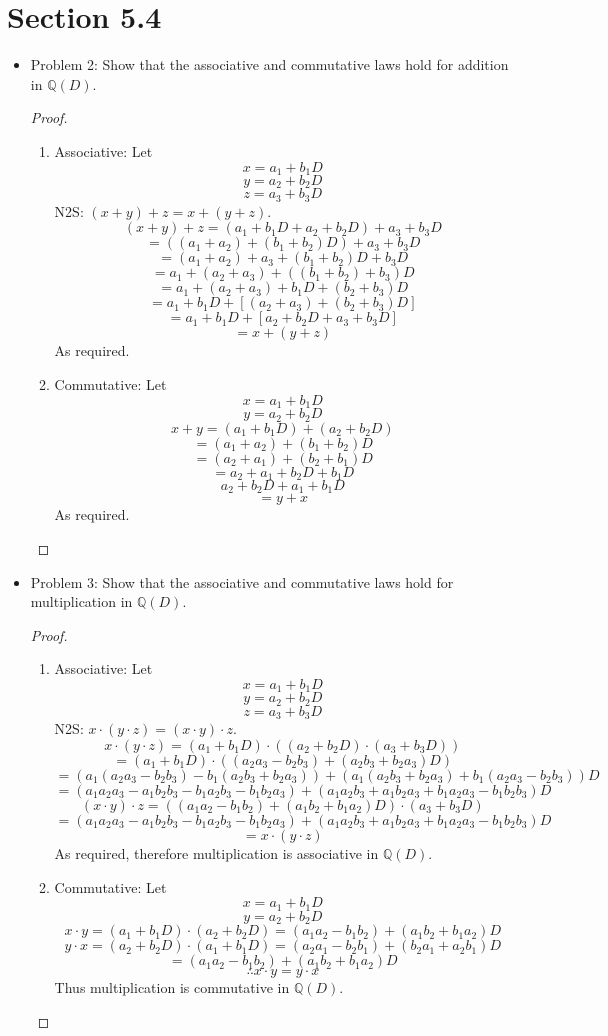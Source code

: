 \documentclass[hidelinks,12pt]{article}
\title{\scalebox{2}{Math 531 Homework 12}}
\author{\scalebox{1.5}{Theo Koss}}
\date{April 2021}
\newcommand{\Q}{\mathbb{Q}}
\begin{document}
\maketitle
\section{Section 5.4}
\begin{itemize}
\item Problem 2: Show that the associative and commutative laws hold for addition in $\Q(D)$.\begin{proof}\begin{enumerate}[label=(\alph*)]
    \item Associative: Let $$x=a_1+b_1D$$ $$y=a_2+b_2D$$ $$z=a_3+b_3D$$ N2S: $(x+y)+z=x+(y+z)$. $$(x+y)+z=(a_1+b_1D+a_2+b_2D)+a_3+b_3D$$ $$=((a_1+a_2)+(b_1+b_2)D)+a_3+b_3D$$ $$=(a_1+a_2)+a_3+(b_1+b_2)D+b_3D$$ $$=a_1+(a_2+a_3)+((b_1+b_2)+b_3)D$$ $$=a_1+(a_2+a_3)+b_1D+(b_2+b_3)D$$ $$=a_1+b_1D+[(a_2+a_3)+(b_2+b_3)D]$$ $$=a_1+b_1D+[a_2+b_2D+a_3+b_3D]$$ $$=x+(y+z)$$ As required.
    \item Commutative: Let $$x=a_1+b_1D$$ $$y=a_2+b_2D$$ $$x+y=(a_1+b_1D)+(a_2+b_2D)$$ $$=(a_1+a_2)+(b_1+b_2)D$$ $$=(a_2+a_1)+(b_2+b_1)D$$ $$=a_2+a_1+b_2D+b_1D$$ $$a_2+b_2D+a_1+b_1D$$ $$=y+x$$ As required.
 \end{enumerate}
\end{proof}
\item Problem 3: Show that the associative and commutative laws hold for multiplication in $\Q(D)$.\begin{proof}\begin{enumerate}[label=(\alph*)]
\item Associative: Let $$x=a_1+b_1D$$ $$y=a_2+b_2D$$ $$z=a_3+b_3D$$ N2S: $x\cdot (y\cdot z)=(x\cdot y)\cdot z$. $$x\cdot (y\cdot z)=(a_1+b_1D)\cdot((a_2+b_2D)\cdot(a_3+b_3D))$$ $$=(a_1+b_1D)\cdot((a_2a_3-b_2b_3)+(a_2b_3+b_2a_3)D)$$ $$=(a_1(a_2a_3-b_2b_3)-b_1(a_2b_3+b_2a_3))+(a_1(a_2b_3+b_2a_3)+b_1(a_2a_3-b_2b_3))D$$ $$=(a_1a_2a_3-a_1b_2b_3-b_1a_2b_3-b_1b_2a_3)+(a_1a_2b_3+a_1b_2a_3+b_1a_2a_3-b_1b_2b_3)D$$ 
$$(x\cdot y)\cdot z=((a_1a_2-b_1b_2)+(a_1b_2+b_1a_2)D)\cdot(a_3+b_3D)$$ $$=(a_1a_2a_3-a_1b_2b_3-b_1a_2b_3-b_1b_2a_3)+(a_1a_2b_3+a_1b_2a_3+b_1a_2a_3-b_1b_2b_3)D$$ $$=x\cdot (y\cdot z)$$ As required, therefore multiplication is associative in $\Q(D)$.

\item Commutative: Let $$x=a_1+b_1D$$ $$y=a_2+b_2D$$ $$x\cdot y=(a_1+b_1D)\cdot(a_2+b_2D)=(a_1a_2-b_1b_2)+(a_1b_2+b_1a_2)D$$ $$y\cdot x=(a_2+b_2D)\cdot(a_1+b_1D)=(a_2a_1-b_2b_1)+(b_2a_1+a_2b_1)D$$ $$=(a_1a_2-b_1b_2)+(a_1b_2+b_1a_2)D$$
$$\therefore x\cdot y=y\cdot x$$ Thus multiplication is commutative in $\Q(D)$.
\end{enumerate}
\end{proof}
\end{itemize}
\end{document}
